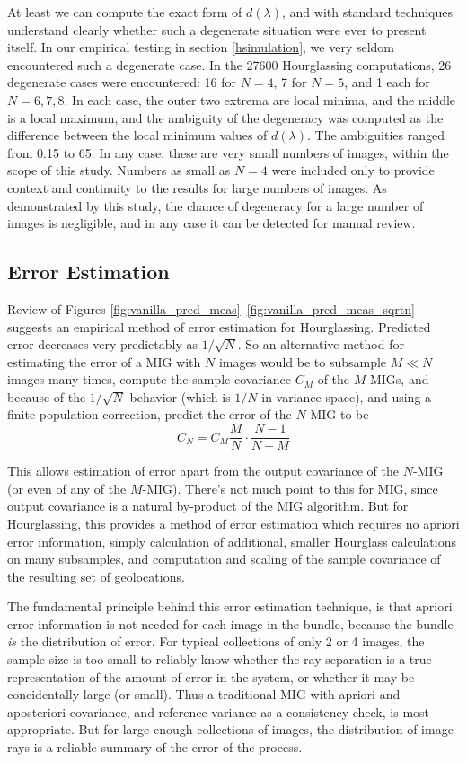 \documentclass[10pt]{amsart}
\begin{document}
At least we can compute the exact form of $d(\lambda)$, and with standard
techniques understand clearly whether such a degenerate situation were ever to
present itself. In our empirical testing in section \ref{hsimulation}, we very
seldom encountered such a degenerate case. In the 27600 Hourglassing
computations, 26 degenerate cases were encountered: 16 for $N=4$, 7 for $N=5$,
and 1 each for $N=6,7,8$. In each case, the outer two extrema are local minima,
and the middle is a local maximum, and the ambiguity of the degeneracy was
computed as the difference between the local minimum values of $d(\lambda)$. The
ambiguities ranged from 0.15 to 65. In any case, these are very small numbers of
images, within the scope of this study. Numbers as small as $N=4$ were included
only to provide context and continuity to the results for large numbers of
images. As demonstrated by this study, the chance of degeneracy for a large
number of images is negligible, and in any case it can be detected for manual
review.


\subsection{Error Estimation}
Review of Figures \ref{fig:vanilla_pred_meas}--\ref{fig:vanilla_pred_meas_sqrtn}
suggests an empirical meth\-od of error estimation for Hourglassing. Predicted
error decreases very predictably as $1/\sqrt N$. So an alternative method for
estimating the error of a MIG with $N$ images would be to subsample $M \ll N$
images many times, compute the sample covariance $C_M$ of the $M$-MIGs, and
because of the $1/\sqrt N$ behavior (which is $1/N$ in variance space), and
using a finite population correction, predict the error of the $N$-MIG to
be $$C_N=C_M\frac{M}{N}\cdot\frac{N-1}{N-M}$$

This allows estimation of error apart from the output covariance of the $N$-MIG
(or even of any of the $M$-MIG). There's not much point to this for MIG, since
output covariance is a natural by-product of the MIG algorithm. But for
Hourglassing, this provides a method of error estimation which requires no
apriori error information, simply calculation of additional, smaller Hourglass
calculations on many subsamples, and computation and scaling of the sample
covariance of the resulting set of geolocations.

The fundamental principle behind this error estimation technique, is that
apriori error information is not needed for each image in the bundle, because
the bundle {\em is} the distribution of error. For typical collections of only 2
or 4 images, the sample size is too small to reliably know whether the ray
separation is a true representation of the amount of error in the system, or
whether it may be concidentally large (or small). Thus a traditional MIG with
apriori and aposteriori covariance, and reference variance as a consistency
check, is most appropriate. But for large enough collections of images, the
distribution of image rays is a reliable summary of the error of the process.
\end{document}
